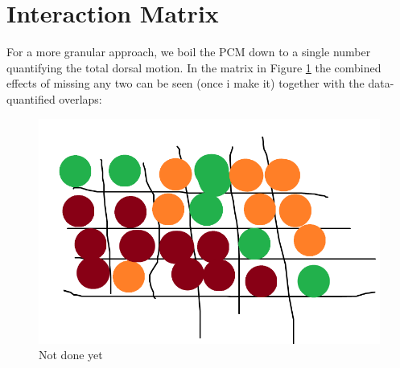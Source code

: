 \begin{figure}[H]
    \centering
\end{figure}


\section{Interaction Matrix}
For a more granular approach, we boil the PCM down to a single number quantifying the total dorsal motion. In the matrix in Figure \ref{fig:PCM-matrix} the combined effects of missing any two can be seen (once i make it) together with the data-quantified overlaps:
\begin{figure}[H]
    \centering
    \includegraphics[width=1.\linewidth]{chapters/Results/figures/placeholder_domain_matrix.png}
    \caption{Not done yet}
    \label{fig:PCM-matrix}
\end{figure}

